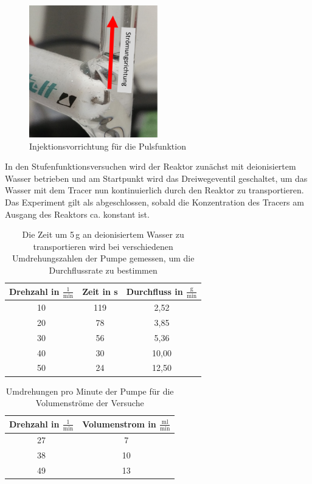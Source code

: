 \documentclass[12pt,liststotoc]{report}
\begin{document}
\begin{figure}[H]
\centering
\includegraphics[width=0.5\textwidth]{Graphics/Injektionsvorrichtung.PNG}
\caption{Injektionsvorrichtung für die Pulsfunktion}
\label{Injektionsvorrichtung}
\end{figure}
\noindent
In den Stufenfunktionsversuchen wird der Reaktor zunächst mit deionisiertem Wasser betrieben und am Startpunkt wird das Dreiwegeventil geschaltet, um das Wasser mit dem Tracer nun kontinuierlich durch den Reaktor zu transportieren. Das Experiment gilt als abgeschlossen, sobald die Konzentration des Tracers am Ausgang des Reaktors ca. konstant ist. 

\begin{table}[H]
\centering
\caption[Pumpenkalibration]{Die Zeit um 5\,g an deionisiertem Wasser zu transportieren wird bei verschiedenen Umdrehungszahlen der Pumpe gemessen, um die Durchflussrate zu bestimmen}
\begin{tabular}{ccc}
\toprule 
Drehzahl in $\frac{1}{\text{min}}$ & Zeit in s & Durchfluss in $\frac{\text{g}}{\text{min}}$\\
\midrule
10 & 119 & 2,52\\
20 & 78 & 3,85 \\
30 & 56 & 5,36 \\
40 & 30 & 10,00 \\
50 & 24 & 12,50 \\
\bottomrule
\end{tabular}
\label{tab:Pumpenkalibration}
\end{table}
\noindent

\begin{table}[H]
\centering
\caption{Umdrehungen pro Minute der Pumpe für die Volumenströme der Versuche}
\begin{tabular}{cc}
\toprule 
Drehzahl in $\frac{1}{\text{min}}$ & Volumenstrom in $\frac{\text{ml}}{\text{min}}$\\
\midrule
27 & 7 \\
38 & 10 \\
49 & 13 \\
\bottomrule
\end{tabular}
\label{tab:Volumenströme}
\end{table}
\noindent
\end{document}
